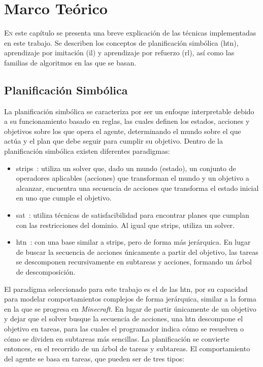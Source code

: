 \chapter{Marco Teórico}
\label{chap:marco_teorico}

\lettrine{E}{n} este capítulo se presenta una breve explicación de las técnicas implementadas en este trabajo.
Se describen los conceptos de planificación simbólica (\gls{htn}), aprendizaje por imitación (\gls{il}) y aprendizaje por refuerzo (\gls{rl}),
así como las familias de algoritmos en las que se basan.

\section{Planificación Simbólica}
La planificación simbólica se caracteriza por ser un enfoque interpretable debido a su funcionamiento basado en reglas,
las cuales definen los estados, acciones y objetivos sobre los que opera el agente, determinando el mundo sobre el que actúa y el plan que debe seguir para cumplir su objetivo.
Dentro de la planificación simbólica existen diferentes paradigmas:

\begin{itemize}
    \item \gls{strips}~\cite{DBLP:journals/ai/FikesN71}: utiliza un \gls{solver} que, dado un mundo (estado), 
    un conjunto de operadores aplicables (acciones) que transforman el mundo y un objetivo a alcanzar, 
    encuentra una secuencia de acciones que transforma el estado inicial en uno que cumple el objetivo.

    \item \gls{sat}~\cite{DBLP:conf/ecai/KautzS92}: utiliza técnicas de satisfacibilidad para encontrar planes que 
    cumplan con las restricciones del dominio. Al igual que \gls{strips}, utiliza un \gls{solver}.

    \item \gls{htn}~\cite{DBLP:conf/aips/ErolHN94, DBLP:conf/ijcai/OntanonB15}: con una base similar a \gls{strips}, 
    pero de forma más jerárquica. En lugar de buscar la secuencia de acciones únicamente a partir del objetivo, 
    las tareas se descomponen recursivamente en subtareas y acciones, formando un árbol de descomposición.
\end{itemize}

El paradigma seleccionado para este trabajo es el de las \gls{htn}, por su capacidad para modelar comportamientos 
complejos de forma jerárquica, similar a la forma en la que se progresa en \textit{Minecraft}.
En lugar de partir únicamente de un objetivo y dejar que el \gls{solver} busque la secuencia de acciones, 
una \gls{htn} descompone el objetivo en tareas, para las cuales el programador indica cómo se resuelven o cómo 
se dividen en subtareas más sencillas.
La planificación se convierte entonces, en el recorrido de un árbol de tareas y subtareas.
El comportamiento del agente se basa en tareas, que pueden ser de tres tipos:

